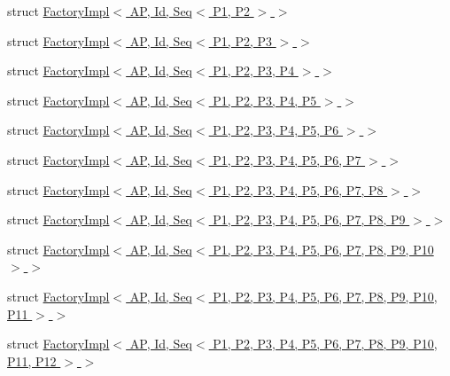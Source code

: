 \begin{DoxyCompactItemize}
struct \hyperlink{structLoki_1_1FactoryImpl_3_01AP_00_01Id_00_01Seq_3_01P1_00_01P2_01_4_01_4}{Factory\+Impl$<$ A\+P, Id, Seq$<$ P1, P2 $>$ $>$}
\item 
struct \hyperlink{structLoki_1_1FactoryImpl_3_01AP_00_01Id_00_01Seq_3_01P1_00_01P2_00_01P3_01_4_01_4}{Factory\+Impl$<$ A\+P, Id, Seq$<$ P1, P2, P3 $>$ $>$}
\item 
struct \hyperlink{structLoki_1_1FactoryImpl_3_01AP_00_01Id_00_01Seq_3_01P1_00_01P2_00_01P3_00_01P4_01_4_01_4}{Factory\+Impl$<$ A\+P, Id, Seq$<$ P1, P2, P3, P4 $>$ $>$}
\item 
struct \hyperlink{structLoki_1_1FactoryImpl_3_01AP_00_01Id_00_01Seq_3_01P1_00_01P2_00_01P3_00_01P4_00_01P5_01_4_01_4}{Factory\+Impl$<$ A\+P, Id, Seq$<$ P1, P2, P3, P4, P5 $>$ $>$}
\item 
struct \hyperlink{structLoki_1_1FactoryImpl_3_01AP_00_01Id_00_01Seq_3_01P1_00_01P2_00_01P3_00_01P4_00_01P5_00_01P6_01_4_01_4}{Factory\+Impl$<$ A\+P, Id, Seq$<$ P1, P2, P3, P4, P5, P6 $>$ $>$}
\item 
struct \hyperlink{structLoki_1_1FactoryImpl_3_01AP_00_01Id_00_01Seq_3_01P1_00_01P2_00_01P3_00_01P4_00_01P5_00_01P6_00_01P7_01_4_01_4}{Factory\+Impl$<$ A\+P, Id, Seq$<$ P1, P2, P3, P4, P5, P6, P7 $>$ $>$}
\item 
struct \hyperlink{structLoki_1_1FactoryImpl_3_01AP_00_01Id_00_01Seq_3_01P1_00_01P2_00_01P3_00_01P4_00_01P5_00_01P6_00_01P7_00_01P8_01_4_01_4}{Factory\+Impl$<$ A\+P, Id, Seq$<$ P1, P2, P3, P4, P5, P6, P7, P8 $>$ $>$}
\item 
struct \hyperlink{structLoki_1_1FactoryImpl_3_01AP_00_01Id_00_01Seq_3_01P1_00_01P2_00_01P3_00_01P4_00_01P5_00_01P6b68f1c37cee13e57ab8c0c2cc5688301}{Factory\+Impl$<$ A\+P, Id, Seq$<$ P1, P2, P3, P4, P5, P6, P7, P8, P9 $>$ $>$}
\item 
struct \hyperlink{structLoki_1_1FactoryImpl_3_01AP_00_01Id_00_01Seq_3_01P1_00_01P2_00_01P3_00_01P4_00_01P5_00_01P623d57a0b18074641c8bca6ad36c44171}{Factory\+Impl$<$ A\+P, Id, Seq$<$ P1, P2, P3, P4, P5, P6, P7, P8, P9, P10 $>$ $>$}
\item 
struct \hyperlink{structLoki_1_1FactoryImpl_3_01AP_00_01Id_00_01Seq_3_01P1_00_01P2_00_01P3_00_01P4_00_01P5_00_01P6938401cd8a7393dd2aec76a5416e9a38}{Factory\+Impl$<$ A\+P, Id, Seq$<$ P1, P2, P3, P4, P5, P6, P7, P8, P9, P10, P11 $>$ $>$}
\item 
struct \hyperlink{structLoki_1_1FactoryImpl_3_01AP_00_01Id_00_01Seq_3_01P1_00_01P2_00_01P3_00_01P4_00_01P5_00_01P698a66b450ca20f38710bb11e700a0275}{Factory\+Impl$<$ A\+P, Id, Seq$<$ P1, P2, P3, P4, P5, P6, P7, P8, P9, P10, P11, P12 $>$ $>$}

\end{DoxyCompactItemize}
